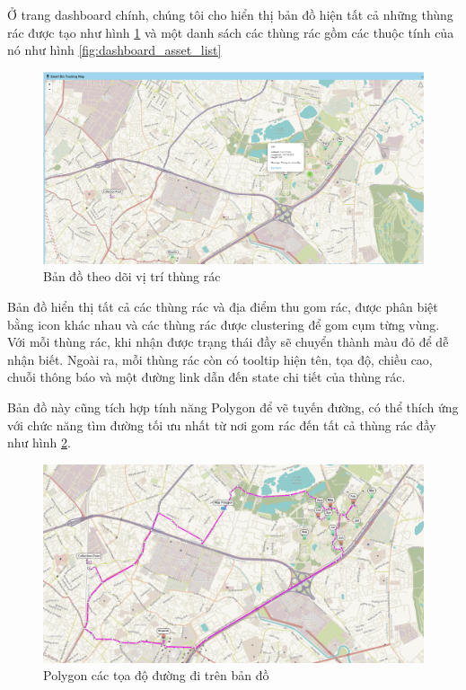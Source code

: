 Ở trang dashboard chính, chúng tôi cho hiển thị bản đồ hiện tất cả những thùng rác được tạo như hình \ref{fig:dashboard_map} và một danh sách các thùng rác gồm các thuộc tính của nó như hình \ref{fig:dashboard_asset_list}

\begin{figure}[H]
    \centering
    \includegraphics[width=\textwidth]{images/Khanh/Thingsboard/Dashboard_map.PNG}
    \caption{Bản đồ theo dõi vị trí thùng rác}
    \label{fig:dashboard_map}
\end{figure}
Bản đồ hiển thị tất cả các thùng rác và địa điểm thu gom rác, được phân biệt bằng icon khác nhau và các thùng rác được clustering để gom cụm từng vùng. Với mỗi thùng rác, khi nhận được trạng thái đầy sẽ chuyển thành màu đỏ để dễ nhận biết. Ngoài ra, mỗi thùng rác còn có tooltip hiện tên, tọa độ, chiều cao, chuỗi thông báo và một đường link dẫn đến state chi tiết của thùng rác. 

Bản đồ này cũng tích hợp tính năng Polygon để vẽ tuyến đường, có thể thích ứng với chức năng tìm đường tối ưu nhất từ nơi gom rác đến tất cả thùng rác đầy như hình \ref{fig:map_optimization}.
\begin{figure}[H]
    \centering
    \includegraphics[width=\textwidth]{images/Khanh/Thingsboard/Road_optimization.PNG}
    \caption{Polygon các tọa độ đường đi trên bản đồ}
    \label{fig:map_optimization}
\end{figure}

